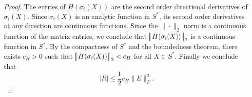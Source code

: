 \documentclass[11pt]{article}
\begin{document}
\begin{proof}
The entries of $H(\sigma_i(X))$ are the second order directional derivatives of $\sigma_i(X)$. Since $\sigma_i(X)$ is an analytic function in $S^*$, its second order derivatives at any direction are continuous functions. Since the $\| \cdot \|_2$ norm is a continuous function of the matrix entries, we conclude that $\norm{H(\sigma_i(X))}_2$ is a continuous function in $S^*$. By the compactness of $S^*$ and the boundedness theorem, there exists $c_H>0$ such that  $\norm{H(\sigma_i(X))}_2 < c_H$ for all $X \in S^*$. Finally we conclude that
\begin{equation}
|R| \leq \frac12 c_H \|E \|^2_F  .
\end{equation}
\end{proof}

\end{document}
